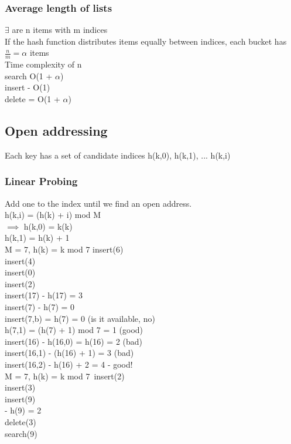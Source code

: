 \documentclass[12pt]{article}
\begin{document}
	\subsubsection*{Average length of lists}
	$\exists$ are n items with m indices\\
	If the hash function distributes items equally between indices, each bucket has $\frac{n}{m} = \alpha$ items\\
	
	Time  complexity of n\\
	search O(1 + $\alpha$)\\
	insert - O(1)\\
	delete = O(1 + $\alpha$)\\
	
	
	\subsection*{Open addressing}
	Each key has a set of candidate indices h(k,0), h(k,1), ... h(k,i)\\
	
	\subsubsection*{Linear Probing}
	Add one to the index until we find an open address.\\
	
	h(k,i) = (h(k) + i) mod M\\
	$\implies$ h(k,0) = k(k)\\
	h(k,1) = h(k) + 1\\
	
	M = 7, h(k) = k mod 7
	insert(6)\\
	insert(4)\\
	insert(0)\\
	insert(2)\\
	insert(17) - h(17) = 3\\
	insert(7) - h(7) = 0\\
	insert(7,b) = h(7) = 0 (is it available, no)\\
	h(7,1) = (h(7) + 1) mod 7 = 1 (good)\\
	insert(16) - h(16,0) = h(16) = 2 (bad)\\
	insert(16,1) - (h(16) + 1) = 3 (bad)\\
	insert(16,2) - h(16) + 2 = 4 - good!\\
	
	M = 7, h(k) = k mod 7\
	insert(2)\\
	insert(3)\\
	insert(9)\\ - h(9) = 2\\
	delete(3)\\
	search(9)\\
	
\end{document}
